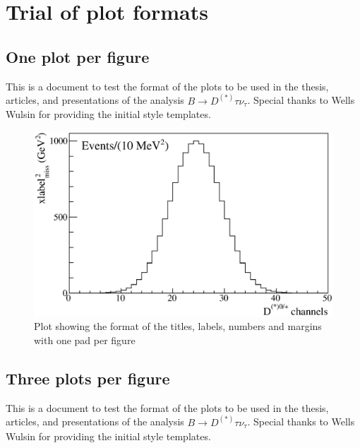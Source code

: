 \documentclass[12pt,twoside]{report}
\begin{document}
\makeatletter
\renewcommand*\l@subsection{\@dottedtocline{2}{1.5em}{2.8em}}
\makeatother


\chapter{Trial of plot formats}
\section{One plot per figure}
This is a document to test the format of the plots to be used in the thesis, articles,
and presentations of the analysis $B\to D^{(*)}\tau\nu_{\tau}$. 
Special thanks to Wells Wulsin for providing the initial style templates.

\begin{figure}[h]
\begin{center}\includegraphics[width=5.2in]{Plot_1Pads.eps}\end{center}
\vspace{-0.2in}
\caption{Plot showing the format of the titles, labels, numbers and margins with one pad per figure}
\end{figure}

\newpage
\section{Three plots per figure}
This is a document to test the format of the plots to be used in the thesis, articles,
and presentations of the analysis $B\to D^{(*)}\tau\nu_{\tau}$. 
Special thanks to Wells Wulsin for providing the initial style templates.
\end{document}
